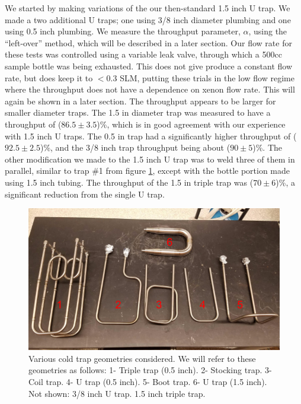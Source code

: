 We started by making variations of the our then-standard 1.5 inch U trap. We made a two additional U traps; one using 3/8 inch diameter plumbing and one using 0.5 inch plumbing. We measure the throughput parameter, $\alpha$, using the ``left-over'' method, which will be described in a later section. Our flow rate for these tests was controlled using a variable leak valve, through which a 500cc sample bottle was being exhausted. This does not give produce a constant flow rate, but does keep it to $<0.3$ SLM, putting these trials in the low flow regime where the throughput does not have a dependence on xenon flow rate. This will again be shown in a later section. The throughput appears to be larger for smaller diameter traps. The 1.5 in diameter trap was measured to have a throughput of ($86.5\pm3.5$)\%, which is in good agreement with our experience with 1.5 inch U traps. The 0.5 in trap had a significantly higher throughput of ($92.5\pm 2.5$)\%, and the 3/8 inch trap throughput being about ($90\pm 5$)\%. The other modification we made to the 1.5 inch U trap was to weld three of them in parallel, similar to trap \#1 from figure \ref{fig:geometries}, except with the bottle portion made using 1.5 inch tubing. The throughput of the 1.5 in triple trap was ($70\pm6$)\%, a significant reduction from the single U trap.
\begin{figure}[h!]
\centering
\includegraphics[width=\textwidth]{Figures/cold_trap_geometries.png}
\caption{Various cold trap geometries considered. We will refer to these geometries as follows: 1- Triple trap (0.5 inch). 2- Stocking trap. 3- Coil trap. 4- U trap (0.5 inch). 5- Boot trap. 6- U trap (1.5 inch). Not shown: 3/8 inch U trap. 1.5 inch triple trap. }
\label{fig:geometries}
\end{figure}

